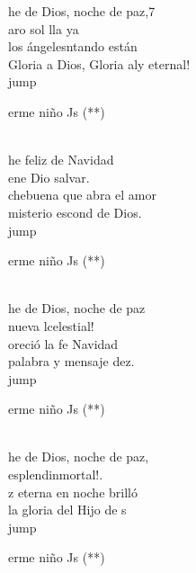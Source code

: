 \begin{cancion}%
	he de Dios, noche de paz,7\\
	aro sol lla ya\\
	los ángelesntando están\\
	Gloria a Dios, Gloria aly eternal!\\jump\\
	\begin{chorus}%
	erme niño Js (**) \\
	\end{chorus}%
	\jump\\
	he feliz de Navidad\\
	ene Dio salvar.\\
	chebuena que abra el amor\\
	 misterio escond de Dios.\\jump\\
	\begin{chorus}%
	erme niño Js (**) \\
	\end{chorus}%
	\jump\\
	he de Dios, noche de paz\\
	nueva lcelestial!\\
	oreció la fe Navidad\\
	 palabra y mensaje dez.\\jump\\
	\begin{chorus}%
	erme niño Js (**) \\
	\end{chorus}%
	\jump\\
	he de Dios, noche de paz,\\
	esplendinmortal!.\\
	z eterna en noche brilló\\
	 la gloria del Hijo de s\\jump\\
	\begin{chorus}%
	erme niño Js (**) \\
	\end{chorus}%
	\jump\\
\end{cancion}%
